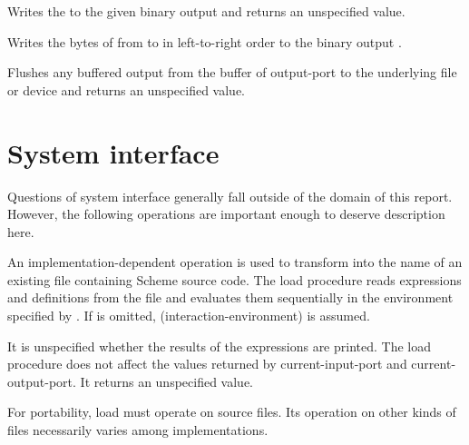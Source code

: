 \begin{entry}{
}

Writes the  to
the given binary output  and returns an unspecified value.

\end{entry}

\begin{entry}{
}

Writes the bytes of 
from  to 
in left-to-right order to the
binary output .

\end{entry}

\begin{entry}{
}

Flushes any buffered output from the buffer of output-port to the
underlying file or device and returns an unspecified value.

\end{entry}


\section{System interface}

Questions of system interface generally fall outside of the domain of this
report.  However, the following operations are important enough to
deserve description here.


\begin{entry}{
}

An implementation-dependent operation is used to transform
 into the name of an existing file
containing Scheme source code.  The {\cf load} procedure reads
expressions and definitions from the file and evaluates them
sequentially in the environment specified by .
If  is omitted, {\cf (interaction-environment)}
is assumed.

It is unspecified whether the results of the expressions
are printed.  The {\cf load} procedure does not affect the values
returned by {\cf current-input-port} and {\cf current-output-port}.
It returns an unspecified value.


\begin{rationale}
For portability, {\cf load} must operate on source files.
Its operation on other kinds of files necessarily varies among
implementations.
\end{rationale}
\end{entry}

